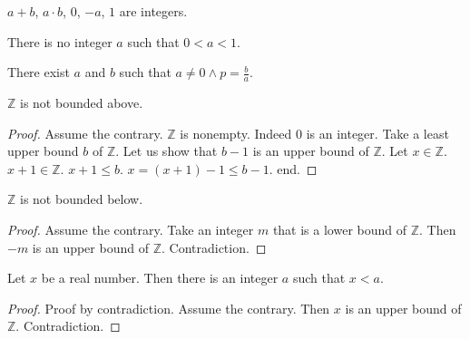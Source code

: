 \documentclass{article}
\begin{document}
\begin{forthel}

\begin{axiom} $a + b$, $a \cdot b$, $0$, $-a$, $1$ are integers.
\end{axiom}


\begin{axiom} There is no integer $a$ such that $0 < a < 1$.
\end{axiom}

\begin{axiom} There exist $a$ and $b$ such that 
$a \neq 0 \wedge p = \frac{b}{a}$.
\end{axiom}

\begin{theorem}[Archimedes1] $\mathbb{Z}$ is not bounded above.
\end{theorem}
\begin{proof} Assume the contrary.
$\mathbb{Z}$ is nonempty. Indeed $0$ is an integer.
Take a least upper bound 
$b$ of $\mathbb{Z}$.
Let us show that $b - 1$ is an upper bound of $\mathbb{Z}$.
Let $x \in \mathbb{Z}$. $x + 1 \in \mathbb{Z}$. 
$x + 1 \leq b$.
$x = (x + 1) - 1 \leq b - 1$.
end.
\end{proof}

\begin{theorem} $\mathbb{Z}$ is not bounded below.
\end{theorem}
\begin{proof}
Assume the contrary.
Take an integer $m$ that is a lower bound of $\mathbb{Z}$.
Then $-m$ is an upper bound of $\mathbb{Z}$. Contradiction.
\end{proof} 


\begin{theorem}[Archimedes2] Let $x$ be a real number.
Then there is an integer $a$ 
such that $x < a$.\end{theorem}
\begin{proof} 
Proof by contradiction.
Assume the contrary.
Then
$x$ is an upper bound of $\mathbb{Z}$.
Contradiction.
\end{proof}


\end{forthel}
\end{document}
